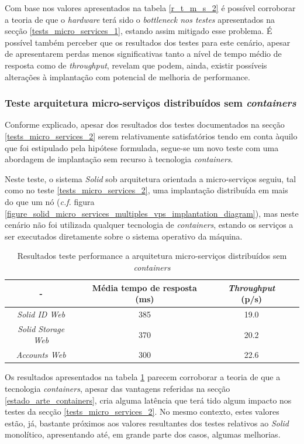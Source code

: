 Com base nos valores apresentados na tabela \ref{r_t_m_s_2} é possível corroborar a teoria de que o \emph{hardware} terá sido o \emph{bottleneck nos testes} apresentados na secção \ref{tests_micro_services_1}, estando assim mitigado esse problema. É possível também perceber que os resultados dos testes para este cenário, apesar de apresentarem perdas menos significativas tanto a nível de tempo médio de resposta como de \emph{throughput}, revelam que podem, ainda, existir possíveis alterações à implantação com potencial de melhoria de performance.

\subsubsection*{Teste arquitetura micro-serviços distribuídos sem \emph{containers} \label{tests_micro_services_3}}

Conforme explicado, apesar dos resultados dos testes documentados na secção \ref{tests_micro_services_2} serem relativamente satisfatórios tendo em conta àquilo que foi estipulado pela hipótese formulada, segue-se um novo teste com uma abordagem de implantação sem recurso à tecnologia \emph{containers}.

Neste teste, o sistema \emph{Solid} sob arquitetura orientada a micro-serviços seguiu, tal como no teste \ref{tests_micro_services_2}, uma implantação distribuída em mais do que um nó (\emph{c.f.} figura \ref{figure_solid_micro_services_multiples_vps_implantation_diagram}), mas neste cenário não foi utilizada qualquer tecnologia de \emph{containers}, estando os serviços a ser executados diretamente sobre o sistema operativo da máquina.

\begin{table}[h]
\centering
\caption{Resultados teste performance a arquitetura micro-serviços distribuídos sem \emph{containers}}
\label{r_t_m_s_3}
\vspace{0.5cm}
\begin{tabular}{c|c|c|c} 
 - & Média tempo de resposta (ms) & \emph{Throughput} (p/s) \\
\hline                          
\emph{Solid ID Web} & 385 & 19.0 \\
\emph{Solid Storage Web} & 370 & 20.2 \\
\emph{Accounts Web} & 300 & 22.6 \\
\end{tabular}
\end{table}

Os resultados apresentados na tabela \ref{r_t_m_s_3} parecem corroborar a teoria de que a tecnologia \emph{containers}, apesar das vantagens referidas na secção \ref{estado_arte_containers}, cria alguma latência que terá tido algum impacto nos testes da secção \ref{tests_micro_services_2}. No mesmo contexto, estes valores estão, já, bastante próximos aos valores resultantes dos testes relativos ao \emph{Solid} monolítico, apresentando até, em grande parte dos casos, algumas melhorias.

